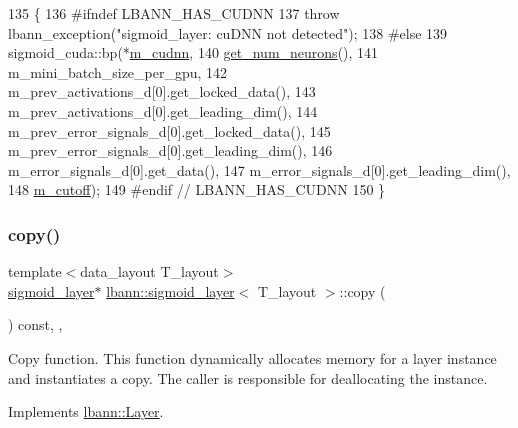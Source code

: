 \begin{DoxyCode}
135                                  \{
136 \textcolor{preprocessor}{  #ifndef LBANN\_HAS\_CUDNN}
137     \textcolor{keywordflow}{throw} lbann\_exception(\textcolor{stringliteral}{"sigmoid\_layer: cuDNN not detected"});
138 \textcolor{preprocessor}{  #else}
139     sigmoid\_cuda::bp(*\hyperlink{classlbann_1_1Layer_a08dbb94239e3b8c96329786c57c72e21}{m\_cudnn},
140                      \hyperlink{classlbann_1_1Layer_aa4de686cc6c2dd38166f42faf874f227}{get\_num\_neurons}(),
141                      m\_mini\_batch\_size\_per\_gpu,
142                      m\_prev\_activations\_d[0].get\_locked\_data(),
143                      m\_prev\_activations\_d[0].get\_leading\_dim(),
144                      m\_prev\_error\_signals\_d[0].get\_locked\_data(),
145                      m\_prev\_error\_signals\_d[0].get\_leading\_dim(),
146                      m\_error\_signals\_d[0].get\_data(),
147                      m\_error\_signals\_d[0].get\_leading\_dim(),
148                      \hyperlink{classlbann_1_1sigmoid__layer_ab4a50a9ae123aef61ff3f0c9c066bdff}{m\_cutoff});
149 \textcolor{preprocessor}{  #endif // LBANN\_HAS\_CUDNN}
150   \}
\end{DoxyCode}
\mbox{\label{classlbann_1_1sigmoid__layer_a9ebc522a655f638eae27e51e759ad72f}} 
\subsubsection{\texorpdfstring{copy()}{copy()}}
{\footnotesize\ttfamily template$<$data\+\_\+layout T\+\_\+layout$>$ \\
\hyperlink{classlbann_1_1sigmoid__layer}{sigmoid\+\_\+layer}$\ast$ \hyperlink{classlbann_1_1sigmoid__layer}{lbann\+::sigmoid\+\_\+layer}$<$ T\+\_\+layout $>$\+::copy (\begin{DoxyParamCaption}{ }\end{DoxyParamCaption}) const\hspace{0.3cm}{\ttfamily [inline]}, {\ttfamily [override]}, {\ttfamily [virtual]}}

Copy function. This function dynamically allocates memory for a layer instance and instantiates a copy. The caller is responsible for deallocating the instance. 

Implements \hyperlink{classlbann_1_1Layer_af420f22bbac801c85483ade84588a23f}{lbann\+::\+Layer}.



